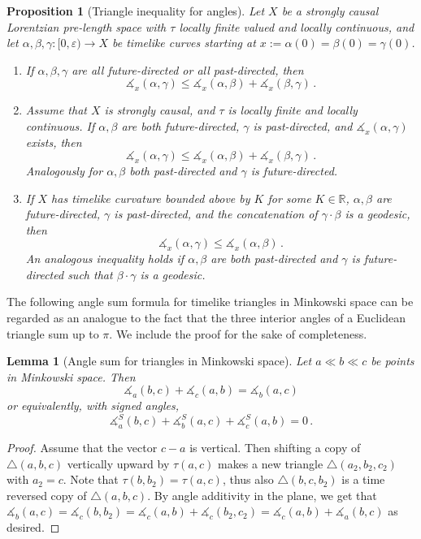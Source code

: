\documentclass[11pt,reqno]{amsart}
\theoremstyle{definition}
\theoremstyle{definition}
\theoremstyle{plain}
\newtheorem{pop}[dfn]{Proposition}
\newtheorem{lem}[dfn]{Lemma}
\theoremstyle{remark}
\newcommand{\R}{\mathbb R}
\newcommand{\ma}{\measuredangle}
\begin{document}
\begin{pop}[Triangle inequality for angles]
\label{pop:triangle inequality angles}
Let $X$ be a strongly causal Lorentzian pre-length space with $\tau$ locally finite valued and locally continuous, and let $\alpha,\beta,\gamma\colon [0, \varepsilon) \to X$ be timelike curves starting at $x:=\alpha(0) = \beta(0) = \gamma(0)$. 
\begin{enumerate}[label=(\roman*)]
    \item\label{FuFuFu/PaPaPa} If $\alpha,\beta,\gamma$ are all future-directed or all past-directed, then
    \[
    \ma_x(\alpha,\gamma) \leq \ma_x(\alpha,\beta) + \ma_x(\beta,\gamma) \, .
    \]
    \item\label{FuFuPa/PaPaFu} Assume that $X$ is strongly causal, and $\tau$ is locally finite and locally continuous. If $\alpha,\beta$ are both future-directed, $\gamma$ is past-directed, and $\ma_x(\alpha,\gamma)$ exists, then 
    \[
    \ma_{x}(\alpha,\gamma)\leq \ma_{x}(\alpha,\beta) + \ma_x(\beta,\gamma)\, .    
    \]
    Analogously for $\alpha,\beta$ both past-directed and $\gamma$ is future-directed.
    \item\label{triIneqAng:AlongGeo} If $X$ has timelike curvature bounded above by $K$ for some $K\in \R$, $\alpha,\beta$ are future-directed, $\gamma$ is past-directed, and the concatenation of $\gamma\cdot \beta$ is a geodesic, then
    \[
    \ma_{x}(\alpha,\gamma)\leq \ma_{x}(\alpha,\beta) \, .    
    \]
    An analogous inequality holds if $\alpha,\beta$ are both past-directed and $\gamma$ is future-directed such that $\beta\cdot \gamma$ is a geodesic.
\end{enumerate}
\end{pop}

The following angle sum formula for timelike triangles in Minkowski space can be regarded as an analogue to the fact that the three interior angles of a Euclidean triangle sum up to $\pi$. We include the proof for the sake of completeness.

\begin{lem}[Angle sum for triangles in Minkowski space]
\label{lem:angleSumMink}
Let $a\ll b\ll c$ be points in Minkowski space. Then
\[
\ma_a(b,c)+\ma_c(a,b)=\ma_b(a,c)
\]
or equivalently, with signed angles,
\[
\ma_a^S(b,c)+\ma_b^S(a,c)+\ma_c^S(a,b)=0 \, .
\]
\end{lem}
\begin{proof}
Assume that the vector $c-a$ is vertical. Then shifting a copy of $\triangle(a,b,c)$ vertically upward by $\tau(a,c)$ makes a new triangle $\triangle(a_2,b_2,c_2)$ with $a_2=c$. Note that $\tau(b,b_2)=\tau(a,c)$, thus also $\triangle(b,c,b_2)$ is a time reversed copy of $\triangle(a,b,c)$. By angle additivity in the plane, we get that $\ma_b(a,c)=\ma_c(b,b_2)=\ma_c(a,b)+\ma_c(b_2,c_2)=\ma_c(a,b)+\ma_a(b,c)$ as desired.
\end{proof}
\end{document}
